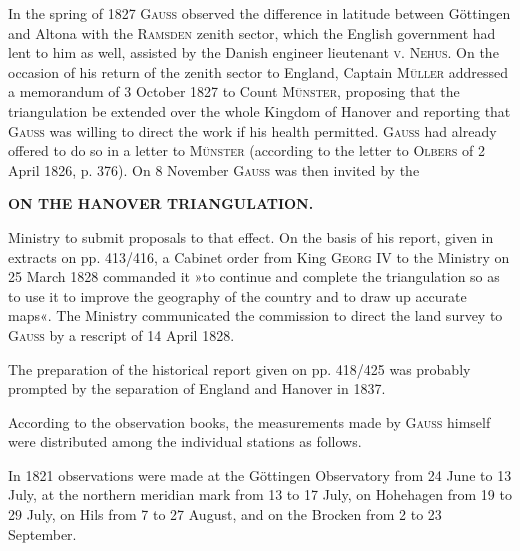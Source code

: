 \par\noindent\hspace*{\parindent}In the spring of 1827 \textsc{Gauss} observed the difference in latitude between Göttingen and Altona with the \textsc{Ramsden} zenith sector, which the English government had lent to him as well, assisted by the Danish engineer lieutenant \textsc{v. Nehus}. On the occasion of his return of the zenith sector to England, Captain \textsc{Müller} addressed a memorandum of 3 October 1827 to Count \textsc{Münster}, proposing that the triangulation be extended over the whole Kingdom of Hanover and reporting that \textsc{Gauss} was willing to direct the work if his health permitted. \textsc{Gauss} had already offered to do so in a letter to \textsc{Münster} (according to the letter to \textsc{Olbers} of 2 April 1826, p. 376). On 8 November \textsc{Gauss} was then invited by the

\par\clearpage
\noindent\null\hfill\textbf{ON THE HANOVER TRIANGULATION.}\hfill{}\par\medskip
\noindent Ministry to submit proposals to that effect. On the basis of his report, given in extracts on pp. 413/416, a Cabinet order from King \textsc{Georg} IV to the Ministry on 25 March 1828 commanded it »to continue and complete the triangulation so as to use it to improve the geography of the country and to draw up accurate maps«. The Ministry communicated the commission to direct the land survey to \textsc{Gauss} by a rescript of 14 April 1828.

\par\noindent\hspace*{\parindent}The preparation of the historical report given on pp. 418/425 was probably prompted by the separation of England and Hanover in 1837.
\par\bigskip
\par\noindent\hspace*{\parindent}According to the observation books, the measurements made by \textsc{Gauss} himself were distributed among the individual stations as follows.

\par\noindent\hspace*{\parindent}In 1821 observations were made at the Göttingen Observatory from 24 June to 13 July, at the northern meridian mark from 13 to 17 July, on Hohehagen from 19 to 29 July, on Hils from 7 to 27 August, and on the Brocken from 2 to 23 September.

